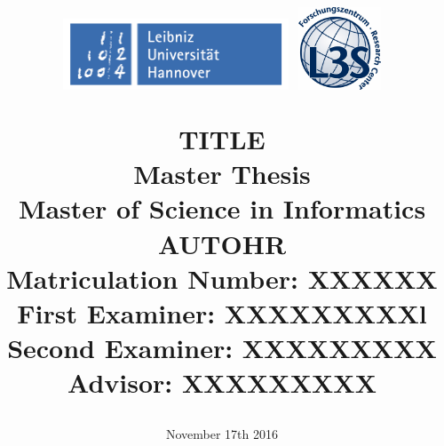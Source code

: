 \documentclass[12pt, a4paper, twoside, openright]{report}
\date{November 17th 2016}
\theoremstyle{definition}
\theoremstyle{named}
\theoremstyle{def}
\begin{document}
\parindent 0pt
\parskip 6pt

\title{
\begin{figure}[h!]
	\includegraphics[width=0.6\textwidth, valign=t]{Grafiken/luh_logo_rgb.jpg}
	\hfill
	\includegraphics[width=0.22\textwidth, valign=t]{Grafiken/l3slogo.png}
\end{figure}
\LARGE{\textbf{TITLE}}
\\[2cm]
\normalsize{\textbf{Master Thesis}}\\
\normalsize{Master of Science in Informatics}
\\[2cm]
\normalsize{\textbf{AUTOHR}}\\
\normalsize{Matriculation Number: XXXXXX}
\\[2cm]
\normalsize{First Examiner: XXXXXXXXXl}\\
\normalsize{Second Examiner: XXXXXXXXX}\\
\normalsize{Advisor: XXXXXXXXX}
}
\author{}
\maketitle


%




\tableofcontents

\parskip 12pt



\parskip 6pt

\nocite{*}
{}


\listoffigures
{}
\listoftables
\end{document}
